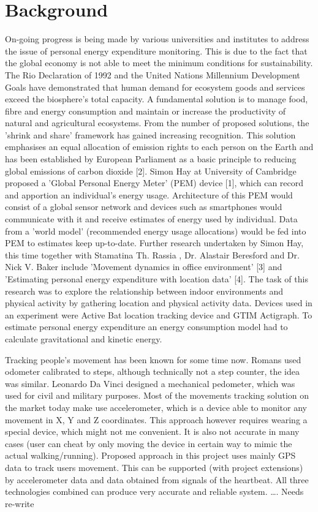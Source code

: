 \documentclass[12pt, a4paper]{report}   %
\begin{document}
\section{Background}
On-going progress is being made by various universities and institutes to address the issue of personal energy expenditure monitoring. This is due to the fact that the global economy is not able to meet the minimum conditions for sustainability. The Rio Declaration of 1992 and the United Nations Millennium Development Goals have demonstrated that human demand for ecosystem goods and services exceed the biosphere's total capacity. A fundamental solution is to manage food, fibre and energy consumption and maintain or increase the productivity of natural and agricultural ecosystems. From the number of proposed solutions, the 'shrink and share' framework has gained increasing recognition. This solution emphasises an equal allocation of emission rights to each person on the Earth and has been established by European Parliament as a basic principle to reducing global emissions of carbon dioxide [2].  Simon Hay at University of Cambridge proposed a 'Global Personal Energy Meter' (PEM) device [1], which can record and apportion an individual's energy usage. Architecture of this PEM would consist of a global sensor network and devices such as smartphones would communicate with it and receive estimates of energy used by individual. Data from a 'world model' (recommended energy usage allocations) would be fed into PEM to estimates keep up-to-date.  Further research undertaken by Simon Hay, this time together with Stamatina Th. Rassia , Dr. Alastair Beresford and Dr. Nick V. Baker include 'Movement dynamics in office environment' [3] and 'Estimating personal energy expenditure with location data' [4]. The task of this research was to explore the relationship between indoor environments and physical activity by gathering location and physical activity data. Devices used in an experiment were Active Bat location tracking device and GTIM Actigraph. To estimate personal energy expenditure an energy consumption model had to calculate gravitational and kinetic energy.

Tracking people’s movement has been known for some time now. Romans used odometer calibrated to steps, although technically not a step counter, the idea was similar. Leonardo Da Vinci designed a mechanical pedometer, which was used for civil and military purposes. Most of the movements tracking solution on the market today make use accelerometer, which is a device able to monitor any movement in X, Y and Z coordinates. This approach however requires wearing a special device, which might not me convenient. It is also not accurate in many cases (user can cheat by only moving the device in certain way to mimic the actual walking/running).
Proposed approach in this project uses mainly GPS data to track users movement. This can be supported (with project extensions) by accelerometer data and data obtained from signals of the heartbeat. All three technologies combined can produce very accurate and reliable system.
…. Needs re-write
\end{document}
